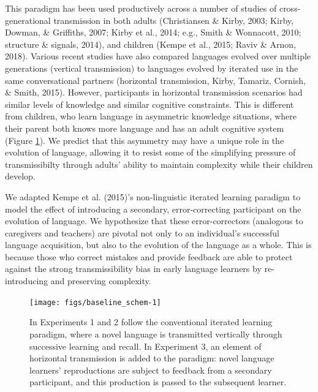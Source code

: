\documentclass[10pt, letterpaper]{article}
\newenvironment{CodeChunk}{}{}
\begin{document}
This paradigm has been used productively across a number of studies of
cross-generational transmission in both adults (Christiansen \& Kirby,
2003; Kirby, Dowman, \& Griffiths, 2007; Kirby et al., 2014; e.g., Smith
\& Wonnacott, 2010; structure \& signals, 2014), and children (Kempe et
al., 2015; Raviv \& Arnon, 2018). Various recent studies have also
compared languages evolved over multiple generations (vertical
transmission) to languages evolved by iterated use in the same
conversational partners (horizontal transmission, Kirby, Tamariz,
Cornish, \& Smith, 2015). However, participants in horizontal
transmission scenarios had similar levels of knowledge and similar
cognitive constraints. This is different from children, who learn
language in asymmetric knowledge situations, where their parent both
knows more language and has an adult cognitive system (Figure
\ref{fig:baseline_schem}). We predict that this asymmetry may have a
unique role in the evolution of language, allowing it to resist some of
the simplifying pressure of transmissibilty through adults' ability to
maintain complexity while their children develop.

We adapted Kempe et al. (2015)'s non-linguistic iterated learning
paradigm to model the effect of introducing a secondary,
error-correcting participant on the evolution of language. We
hypothesize that these error-correctors (analogous to caregivers and
teachers) are pivotal not only to an individual's successful language
acquisition, but also to the evolution of the language as a whole. This
is because those who correct mistakes and provide feedback are able to
protect against the strong transmissibility bias in early language
learners by re-introducing and preserving complexity.

\begin{CodeChunk}
\begin{figure}[tb]

{\centering \texttt{[image: figs/baseline\_schem-1]} 

}

\caption[In Experiments 1 and 2 follow the conventional iterated learning paradigm, where a novel language is transmitted vertically through successive learning and recall]{In Experiments 1 and 2 follow the conventional iterated learning paradigm, where a novel language is transmitted vertically through successive learning and recall. In Experiment 3, an element of horizontal transmission is added to the paradigm: novel language learners' reproductions are subject to feedback from a secondary participant, and this production is passed to the subsequent learner.}\label{fig:baseline_schem}
\end{figure}
\end{CodeChunk}
\end{document}
